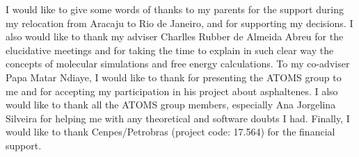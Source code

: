 \documentclass[
	12pt,				%
	openany,			%
	oneside,			%
	a4paper,			%
	english,			%
	brazil				%
	]{abntex2}
\begin{document}
\begin{agradecimentos}
I would like to give some words of thanks to my parents for the support during my relocation from Aracaju to Rio de Janeiro, and for supporting my decisions. I also would like to thank my adviser Charlles Rubber de Almeida Abreu for the elucidative meetings and for taking the time to explain in such clear way the concepts of molecular simulations and free energy calculations. To my co-adviser Papa Matar Ndiaye, I would like to thank for presenting the ATOMS group to me and for accepting my participation in his project about asphaltenes. I also would like to thank all the ATOMS group members, especially Ana Jorgelina Silveira  for helping me with any theoretical and software doubts I had. Finally, I would like to thank Cenpes/Petrobras (project code: 17.564) for the financial support. 
\end{agradecimentos}


\end{document}

